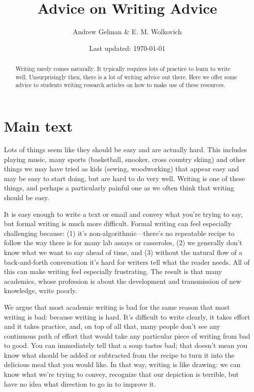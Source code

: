 \documentclass[11pt,letter]{article}
\begin{document}


\title{Advice on Writing Advice}
\author{Andrew Gelman  \& E. M. Wolkovich}
\date{Last updated: \today}
\maketitle

\begin{abstract}
Writing rarely comes naturally. It typically requires lots of practice to learn to write well.  Unsurprisingly then, there is a lot of writing advice out there. Here we offer some advice to students writing research articles on how to make use of these resources. 
\end{abstract}

\section{Main text} %

Lots of things seem like they should be easy and are actually hard. This includes playing music, many sports (basketball, snooker, cross country skiing) and other things we may have tried as kids (sewing, woodworking) that appear easy and may be easy to start doing, but are hard to do very well. Writing is one of these things, and perhaps a particularly painful one as we often think that writing should be easy. 

It is easy enough to write a text or email and convey what you’re trying to say, but formal writing is much more difficult. Formal writing can feel especially challenging because: (1) it's non-algorithmic---there's no repeatable recipe to follow the way there is for many lab assays or casseroles, (2) we generally don't know what we want to say ahead of time, and (3) without the natural flow of a back-and-forth conversation it's hard for writers tell what the reader needs. All of this can make writing feel especially frustrating. The result is that many academics, whose profession is about the development and transmission of new knowledge, write poorly. 

We argue that most academic writing is bad for the same reason that most writing is bad: because writing is hard.  It’s difficult to write clearly, it takes effort and it takes practice, and, on top of all that, many people don’t see any continuous path of effort that would take any particular piece of writing from bad to good.  You can immediately tell that a soup tastes bad; that doesn’t mean you know what should be added or subtracted from the recipe to turn it into the delicious meal that you would like.  In that way, writing is like drawing:  we can know what we’re trying to convey, recognize that our depiction is terrible, but have no idea what direction to go in to improve it.
\end{document}

